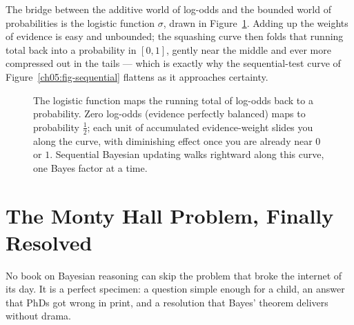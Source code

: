 The bridge between the additive world of log-odds and the bounded world of probabilities
is the logistic function $\sigma$, drawn in Figure~\ref{ch05:fig-logistic}. Adding up the
weights of evidence is easy and unbounded; the squashing curve then folds that running
total back into a probability in $[0,1]$, gently near the middle and ever more compressed
out in the tails --- which is exactly why the sequential-test curve of
Figure~\ref{ch05:fig-sequential} flattens as it approaches certainty.

\begin{figure}[H]
\centering
{}
\caption{The logistic function maps the running total of log-odds back to a probability.
Zero log-odds (evidence perfectly balanced) maps to probability $\tfrac12$; each unit of
accumulated evidence-weight slides you along the curve, with diminishing effect once you
are already near $0$ or $1$. Sequential Bayesian updating walks rightward along this curve,
one Bayes factor at a time.}
\label{ch05:fig-logistic}
\end{figure}

\section{The Monty Hall Problem, Finally Resolved}
\label{ch05:monty}

No book on Bayesian reasoning can skip the problem that broke the internet of its day.
It is a perfect specimen: a question simple enough for a child, an answer that PhDs got
wrong in print, and a resolution that Bayes' theorem delivers without drama.

